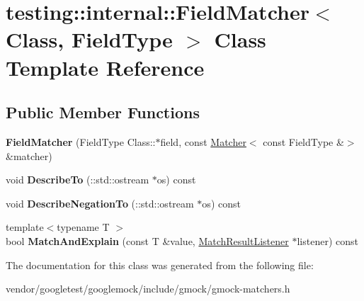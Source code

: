 \hypertarget{classtesting_1_1internal_1_1_field_matcher}{}\section{testing\+:\+:internal\+:\+:Field\+Matcher$<$ Class, Field\+Type $>$ Class Template Reference}
\label{classtesting_1_1internal_1_1_field_matcher}
\subsection*{Public Member Functions}
\begin{DoxyCompactItemize}
\item 
\mbox{\label{classtesting_1_1internal_1_1_field_matcher_a5d20aa34edd41eb898b1f8dd35d585f5}} 
{\bfseries Field\+Matcher} (Field\+Type Class\+::$\ast$field, const \hyperlink{classtesting_1_1_matcher}{Matcher}$<$ const Field\+Type \&$>$ \&matcher)
\item 
\mbox{\label{classtesting_1_1internal_1_1_field_matcher_af0726e67962870bed9f3b184b3edb22e}} 
void {\bfseries Describe\+To} (\+::std\+::ostream $\ast$os) const
\item 
\mbox{\label{classtesting_1_1internal_1_1_field_matcher_a3d8eb433d6a765f8d59b3b07704c3d80}} 
void {\bfseries Describe\+Negation\+To} (\+::std\+::ostream $\ast$os) const
\item 
\mbox{\label{classtesting_1_1internal_1_1_field_matcher_ac0cf950415d64026bc28eb84e6296f1b}} 
{\footnotesize template$<$typename T $>$ }\\bool {\bfseries Match\+And\+Explain} (const T \&value, \hyperlink{classtesting_1_1_match_result_listener}{Match\+Result\+Listener} $\ast$listener) const
\end{DoxyCompactItemize}


The documentation for this class was generated from the following file\+:\begin{DoxyCompactItemize}
\item 
vendor/googletest/googlemock/include/gmock/gmock-\/matchers.\+h\end{DoxyCompactItemize}
